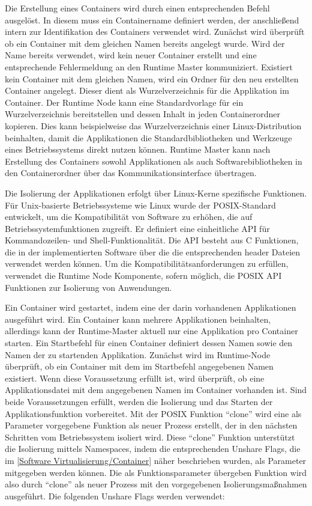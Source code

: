 Die Erstellung eines Containers wird durch einen entsprechenden Befehl ausgelöst. In diesem muss ein Containername definiert werden, der anschließend intern zur Identifikation des Containers verwendet wird. Zunächst wird überprüft ob ein Container mit dem gleichen Namen bereits angelegt wurde. Wird der Name bereits verwendet, wird kein neuer Container erstellt und eine entsprechende Fehlermeldung an den Runtime Master kommuniziert. Existiert kein Container mit dem gleichen Namen, wird ein Ordner für den neu erstellten Container angelegt. Dieser dient als Wurzelverzeichnis für die Applikation im Container. Der Runtime Node kann eine Standardvorlage für ein Wurzelverzeichnis bereitstellen und dessen Inhalt in jeden Containerordner kopieren. Dies kann beispielweise das Wurzelverzeichnis einer Linux-Distribution beinhalten, damit die Applikationen die Standardbibliotheken und Werkzeuge eines Betriebssystems direkt nutzen können. Runtime Master kann nach Erstellung des Containers sowohl Applikationen als auch Softwarebibliotheken in den Containerordner über das Kommunikationsinterface übertragen. 

Die Isolierung der Applikationen erfolgt über Linux-Kerne spezifische Funktionen. Für Unix-basierte Betriebssysteme wie Linux wurde der \gls{POSIX}-Standard entwickelt, um die Kompatibilität von Software zu erhöhen, die auf Betriebssystemfunktionen zugreift. Er definiert eine einheitliche \gls{API} für Kommandozeilen- und Shell-Funktionalität. Die \gls{API} besteht aus C Funktionen, die in der implementierten Software über die die entsprechenden header Dateien verwendet werden können.  Um die Kompatibilitätsanforderungen zu erfüllen, verwendet die Runtime Node Komponente, sofern möglich, die \gls{POSIX} \gls{API} Funktionen zur Isolierung von Anwendungen. 

Ein Container wird gestartet, indem eine der darin vorhandenen Applikationen ausgeführt wird. Ein Container kann mehrere Applikationen beinhalten, allerdings kann der Runtime-Master aktuell nur eine Applikation pro Container starten. Ein Startbefehl für einen Container definiert dessen Namen sowie den Namen der zu startenden Applikation. Zunächst wird im Runtime-Node überprüft, ob ein Container mit dem im Startbefehl angegebenen Namen existiert. Wenn diese Voraussetzung erfüllt ist, wird überprüft, ob eine Applikationsdatei mit dem angegebenen Namen im Container vorhanden ist. Sind beide Voraussetzungen erfüllt, werden die Isolierung und das Starten der Applikationsfunktion vorbereitet. Mit der \gls{POSIX} Funktion \enquote{clone} wird eine als Parameter vorgegebene Funktion als neuer Prozess erstellt, der in den nächsten Schritten vom Betriebssystem isoliert wird. Diese \enquote{clone} Funktion unterstützt die Isolierung mittels Namespaces, indem die entsprechenden Unshare Flags, die im \autoref{Software Virtualisierung/Container} näher beschrieben wurden, als Parameter mitgegeben werden können. Die als Funktionsparameter übergeben Funktion wird also durch \enquote{clone} als neuer Prozess mit den vorgegebenen Isolierungsmaßnahmen ausgeführt. Die folgenden Unshare Flags werden verwendet:

